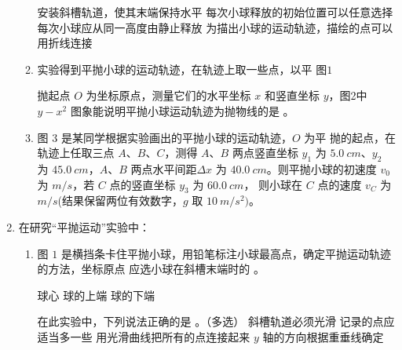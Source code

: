 \begin{enumerate}
\begin{enumerate}
\fourchoices
{安装斜槽轨道，使其末端保持水平}
{每次小球释放的初始位置可以任意选择}
{每次小球应从同一高度由静止释放}
{为描出小球的运动轨迹，描绘的点可以用折线连接}

\item 
实验得到平抛小球的运动轨迹，在轨迹上取一些点，以平
图$ 1 $

抛起点 $ O $ 为坐标原点，测量它们的水平坐标 $ x $ 和竖直坐标 $ y $，图2中 $ y- x^{2} $ 图象能说明平抛小球运动轨迹为抛物线的是  。
\begin{figure}[h!]
\centering

\end{figure}


\item 
图 $ 3 $ 是某同学根据实验画出的平抛小球的运动轨迹，$ O $ 为平
抛的起点，在轨迹上任取三点 $ A $、$ B $、$ C $，测得 $ A $、$ B $ 两点竖直坐标
$ y_{1} $ 为 $ 5.0 \ cm $、$ y_{2} $ 为 $ 45.0 \ cm $，$ A $、$ B $ 两点水平间距$ \Delta x $ 为 $ 40.0 \ cm $。则平抛小球的初速度 $ v_{0} $ 为
$ m/s $，若 $ C $ 点的竖直坐标 $ y_{3} $ 为 $ 60.0 \ cm $，
则小球在 $ C $ 点的速度 $ v_{C} $ 为
$ m/s $(结果保留两位有效数字，$ g $
取 $ 10 \ m/s^{2}) $。
\begin{figure}[h!]
\centering

\end{figure}


\end{enumerate}






\newpage
\item
{}
在研究“平抛运动”实验中：
\begin{enumerate}
\renewcommand{\labelenumi}{\arabic{enumi}.}
\item
图 $ 1 $ 是横挡条卡住平抛小球，用铅笔标注小球最高点，确定平抛运动轨迹的方法，坐标原点
应选小球在斜槽末端时的  。
\begin{figure}[h!]
\centering

\end{figure}

\threechoices
{球心}
{球的上端}
{球的下端}


在此实验中，下列说法正确的是  。（多选）
\fourchoices
{斜槽轨道必须光滑}
{记录的点应适当多一些}
{用光滑曲线把所有的点连接起来}
{$ y $ 轴的方向根据重垂线确定}



\end{enumerate}
\end{enumerate}
